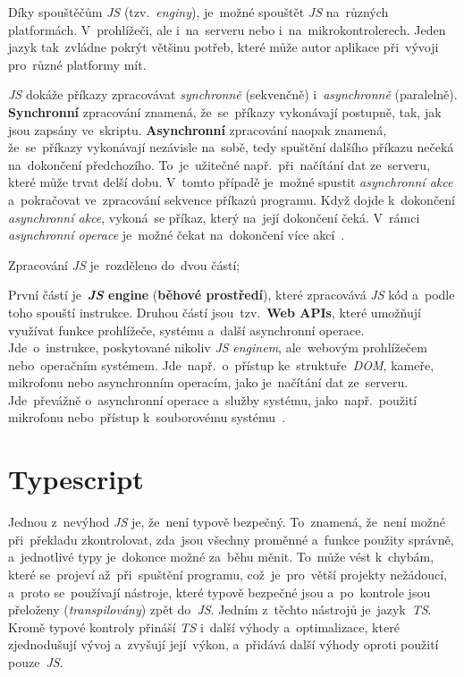 \documentclass[11pt,a4paper]{report}
\let\oldacrshort\acrshort
\renewcommand{\acrshort}[1]{\emph{\normalsize\color[rgb]{0,0,0}\noindent\oldacrshort{#1}}}
\begin{document}
            Díky spouštěčům \acrshort{JS} (tzv.~\emph{enginy}), je~možné spouštět \acrshort{JS} na~různých platformách. V~prohlížeči, ale i~na~serveru nebo i~na~mikrokontrolerech. Jeden jazyk tak~zvládne pokrýt většinu potřeb, které může autor aplikace při~vývoji pro~různé platformy mít.

            \acrshort{JS} dokáže příkazy zpracovávat \emph{synchronně} (sekvenčně) i~\emph{asynchronně} (paralelně). \textbf{Synchronní} zpracování znamená, že~se~příkazy vykonávají postupně, tak, jak jsou zapsány ve~skriptu. \textbf{Asynchronní} zpracování naopak znamená, že~se~příkazy vykonávají nezávisle na~sobě, tedy spuštění dalšího příkazu nečeká na~dokončení předchozího. To~je~užitečné např.~při~načítání dat ze~serveru, které může trvat delší dobu. V~tomto případě je~možné spustit \emph{asynchronní akce} a~pokračovat ve~zpracování sekvence příkazů programu. Když dojde k~dokončení \emph{asynchronní akce}, vykoná~se příkaz, který na~její dokončení čeká. V~rámci \emph{asynchronní operace} je~možné čekat na~dokončení více akcí~\cite{ajax:mdn, Scott2019:programmingpragmatics}.

            Zpracování \acrshort{JS} je~rozděleno do~dvou částí;
            
            První částí je~\textbf{\acrshort{JS} engine} (\textbf{běhové prostředí}), které zpracovává \acrshort{JS} kód a~podle toho spouští instrukce. Druhou částí jsou~tzv.~\textbf{Web APIs}, které umožňují využívat funkce prohlížeče, systému a~další {asynchronní} operace. Jde~o~instrukce, poskytované nikoliv \acrshort{JS} \emph{enginem}, ale~webovým prohlížečem nebo~operačním systémem. Jde~např.~o~přístup ke~struktuře~\acrshort{DOM}, kameře, mikrofonu nebo asynchronním operacím, jako je~načítání dat ze~serveru. Jde~převážně o~asynchronní operace a~služby systému, jako~např.~použití mikrofonu nebo~přístup k~souborovému systému~\cite{kantor_javascript}.

        \section{Typescript}
            Jednou z~nevýhod \acrshort{JS} je, že~není typově bezpečný. To~znamená, že~není možné při~překladu zkontrolovat, zda~jsou všechny proměnné a~funkce použity správně, a~jednotlivé typy je~dokonce možné za~běhu měnit. To~může vést k~chybám, které se~projeví až~při~spuštění programu, což~je~pro~větší projekty nežádoucí, a~proto se~používají nástroje, které typově bezpečné jsou a~po~kontrole jsou přeloženy (\emph{transpilovány}) zpět do~\acrshort{JS}. Jedním z~těchto nástrojů je~jazyk~\acrshort{TS}. Kromě typové kontroly přináší \acrshort{TS} i~další výhody a~optimalizace, které zjednodušují vývoj a~zvyšují její~výkon, a~přidává další výhody oproti použití pouze~\acrshort{JS}.
\end{document}
